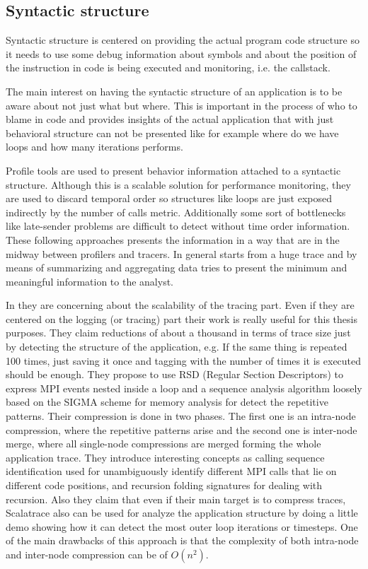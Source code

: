 \documentclass[10pt]{report}
\begin{document}
\subsection{Syntactic structure}

Syntactic structure is centered on providing the actual program code structure so
it needs to use some debug information about symbols and about the position of
the instruction in code is being executed and monitoring, i.e. the callstack.

The main interest on having the syntactic structure of an application is to be
aware about not just what but where. This is important in the process of who to
blame in code and provides insights of the actual application that with just
behavioral structure can not be presented like for example where do we have
loops and how many iterations performs.

Profile tools are used to present behavior information attached to a 
syntactic structure. Although this is a scalable
solution for performance monitoring, they are used to discard temporal order so
structures like loops are just exposed indirectly by the number of calls metric.
Additionally some sort of bottlenecks like late-sender problems are difficult to
detect without time order information. These following approaches presents the
information in a way that are in the midway between profilers and tracers. In
general starts from a huge trace and by means of summarizing and aggregating
data tries to present the minimum and meaningful information to the analyst.

In \cite{noeth2009scalatrace} they are concerning about the scalability of the
tracing part. Even if they are centered on the logging (or tracing) part their
work is really useful for this thesis purposes. They claim reductions of about a
thousand in terms of trace size just by detecting the structure of the
application, e.g. If the same thing is repeated 100 times, just saving it once
and tagging with the number of times it is executed should be enough. They
propose to use RSD (Regular Section Descriptors) to express MPI events nested
inside a loop and a sequence analysis algorithm loosely based on the SIGMA
scheme for memory analysis for detect the repetitive patterns. Their compression
is done in two phases. The first one is an intra-node compression, where the
repetitive patterns arise and the second one is inter-node merge, where all
single-node compressions are merged forming the whole application trace.
They introduce interesting concepts as calling sequence identification used for
unambiguously identify different MPI calls that lie on different code positions, 
and recursion folding signatures for dealing with recursion. Also they claim
that even if their main target is to compress traces, Scalatrace also can be
used for analyze the application structure by doing a little demo showing how it
can detect the most outer loop iterations or timesteps. One of the main
drawbacks of this approach is that the complexity of both intra-node and
inter-node compression can be of $O(n^2)$.
\end{document}
